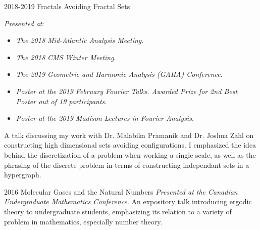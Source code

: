 \documentclass[a4paper]{cv-friggeri}
\begin{document}
\begin{entrylist}
\entry
{2018-2019}
{Fractals Avoiding Fractal Sets}
{}
{\emph{Presented at}:
%
\begin{itemize}
	\item \emph{The 2018 Mid-Atlantic Analysis Meeting}.
	\item \emph{The 2018 CMS Winter Meeting}.
	\item \emph{The 2019 Geometric and Harmonic Analysis (GAHA) Conference}.
	\item \emph{Poster at the 2019 February Fourier Talks. Awarded Prize for 2nd Best Poster out of 19 participants}.
	\item \emph{Poster at the 2019 Madison Lectures in Fourier Analysis}.
\end{itemize}
%
A talk discussing my work with Dr. Malabika Pramanik and Dr. Joshua Zahl on constructing high dimensional sets avoiding configurations. I emphasized the idea behind the discretization of a problem when working a single scale, as well as the phrasing of the discrete problem in terms of constructing independant sets in a hypergraph.}

\entry
{2016}
{Molecular Gases and the Natural Numbers}
{}
{\emph{Presented at the Canadian Undergraduate Mathematics Conference}. An expository talk introducing ergodic theory to undergraduate students, emphasizing its relation to a variety of problem in mathematics, especially number theory.}

\end{entrylist}









\end{document}
